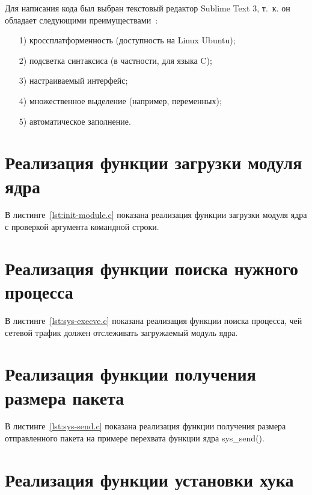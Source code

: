 \documentclass{bmstu}
\begin{document}
Для написания кода был выбран текстовый редактор Sublime Text 3, т.~к. он обладает следующими преимуществами~\cite{SublimeText}:
\begin{enumerate}
\item[1)] кроссплатформенность (доступность на Linux Ubuntu);
\item[2)] подсветка синтаксиса (в частности, для языка C);
\item[3)] настраиваемый интерфейс;
\item[4)] множественное выделение (например, переменных);
\item[5)] автоматическое заполнение.
\end{enumerate}

\section{Реализация функции загрузки модуля ядра}

В листинге~\ref{lst:init-module.c} показана реализация функции загрузки модуля ядра с проверкой аргумента командной строки.


\section{Реализация функции поиска нужного процесса}

В листинге~\ref{lst:sys-execve.c} показана реализация функции поиска процесса, чей сетевой трафик должен отслеживать загружаемый модуль ядра.


\section{Реализация функции получения размера пакета}

В листинге~\ref{lst:sys-send.c} показана реализация функции получения размера отправленного пакета на примере перехвата функции ядра sys\_send().


\section{Реализация функции установки хука}
\end{document}
